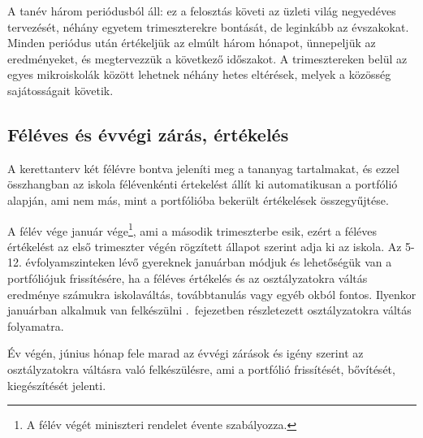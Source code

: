 A tanév három periódusból áll: ez a felosztás követi az üzleti világ negyedéves tervezését, néhány egyetem trimeszterekre bontását, de leginkább az évszakokat. Minden periódus után értékeljük az elmúlt három hónapot, ünnepeljük az eredményeket, és megtervezzük a következő időszakot.  A trimesztereken belül az egyes mikroiskolák között lehetnek néhány hetes eltérések, melyek a közösség sajátosságait követik.

\subsection{Féléves és évvégi zárás, értékelés}
\label{sec:feleves_bontas}
A kerettanterv két félévre bontva jeleníti meg a tananyag tartalmakat, és ezzel összhangban az iskola félévenkénti értekelést állít ki automatikusan a portfólió alapján, ami nem más, mint a portfólióba bekerült értékelések összegyűjtése.

A félév vége január vége\footnote{A félév végét miniszteri rendelet évente szabályozza.}, ami a második trimeszterbe esik, ezért a féléves értékelést az első trimeszter végén rögzített állapot szerint adja ki az iskola.  Az 5-12. évfolyamszinteken lévő gyereknek januárban módjuk és lehetőségük van a portfóliójuk frissítésére, ha a féléves értékelés és az osztályzatokra váltás eredménye számukra iskolaváltás, továbbtanulás vagy egyéb okból fontos. Ilyenkor januárban alkalmuk van felkészülni .~fejezetben részletezett osztályzatokra váltás folyamatra.

Év végén, június hónap fele marad az évvégi zárások és igény szerint az osztályzatokra váltásra való felkészülésre, ami a portfólió frissítését, bővítését, kiegészítését jelenti.